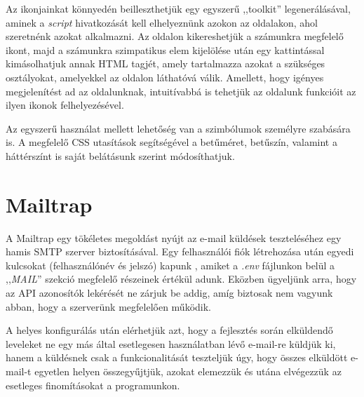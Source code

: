 \documentclass[
]{thesis-ekf}
\theoremstyle{definition}
\theoremstyle{remark}
\begin{document}
                Az ikonjainkat könnyedén beilleszthetjük egy egyszerű ,,toolkit'' legenerálásával, aminek a \emph{script} hivatkozását kell elhelyeznünk azokon az oldalakon, ahol szeretnénk azokat alkalmazni. Az oldalon kikereshetjük a számunkra megfelelő ikont, majd a számunkra szimpatikus elem kijelölése után egy kattintással kimásolhatjuk annak HTML tagjét, amely tartalmazza azokat a szükséges osztályokat, amelyekkel az oldalon láthatóvá válik. Amellett, hogy igényes megjelenítést ad az oldalunknak, intuitívabbá is tehetjük az oldalunk funkcióit az ilyen ikonok felhelyezésével.

                Az egyszerű használat mellett lehetőség van a szimbólumok személyre szabására is. A megfelelő CSS utasítások segítségével a betűméret, betűszín, valamint a háttérszínt is saját belátásunk szerint módosíthatjuk.
	    \section{Mailtrap}
                A Mailtrap\cite{Mailtrap} egy tökéletes megoldást nyújt az e-mail küldések teszteléséhez egy hamis SMTP szerver biztosításával. Egy felhasználói fiók létrehozása után egyedi kulcsokat (felhasználónév és jelszó) kapunk , amiket a \emph{.env} fájlunkon belül a ,,\emph{MAIL}'' szekció megfelelő részeinek értékül adunk. Eközben ügyeljünk arra, hogy az API azonosítók lekérését ne zárjuk be addig, amíg biztosak nem vagyunk abban, hogy a szerverünk megfelelően működik.

                A helyes konfigurálás után elérhetjük azt, hogy a fejlesztés során elküldendő leveleket ne egy más által esetlegesen használatban lévő e-mail-re küldjük ki, hanem a küldésnek csak a funkcionalitását teszteljük úgy, hogy összes elküldött e-mail-t egyetlen helyen összegyűjtjük, azokat elemezzük és utána elvégezzük az esetleges finomításokat a programunkon.
\end{document}
